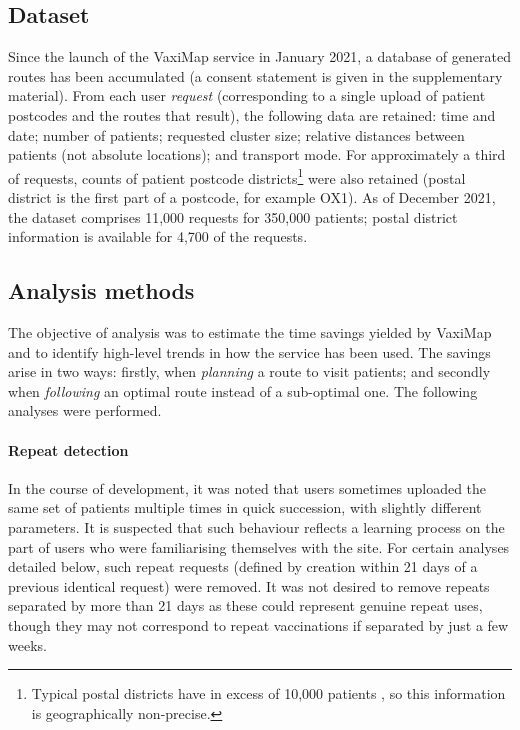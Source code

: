 \documentclass[review]{elsarticle}
\def\vm{VaxiMap}
\begin{document}
\subsection{Dataset}

Since the launch of the \vm{} service in January 2021, a database of generated routes has been accumulated (a consent statement is given in the supplementary material). From each user \textit{request} (corresponding to a single upload of patient postcodes and the routes that result), the following data are retained: time and date; number of patients; requested cluster size; relative distances between patients (not absolute locations); and transport mode. For approximately a third of requests, counts of patient postcode districts\footnote{Typical postal districts have in excess of 10,000 patients \cite{OfficeforNationalStatistics}, so this information is geographically non-precise.} were also retained (postal district is the first part of a postcode, for example OX1). As of December 2021, the dataset comprises 11,000 requests for 350,000 patients; postal district information is available for 4,700 of the requests. 

\subsection{Analysis methods}

The objective of analysis was to estimate the time savings yielded by \vm{} and to identify high-level trends in how the service has been used. The savings arise in two ways: firstly, when \textit{planning} a route to visit patients; and secondly when \textit{following} an optimal route instead of a sub-optimal one. The following analyses were performed. 

\paragraph{Repeat detection}
In the course of development, it was noted that users sometimes uploaded the same set of patients multiple times in quick succession, with slightly different parameters. It is suspected that such behaviour reflects a learning process on the part of users who were familiarising themselves with the site. For certain analyses detailed below, such repeat requests (defined by creation within 21 days of a previous identical request) were removed. It was not desired to remove repeats separated by more than 21 days as these could represent genuine repeat uses, though they may not correspond to repeat vaccinations if separated by just a few weeks. 
\end{document}
